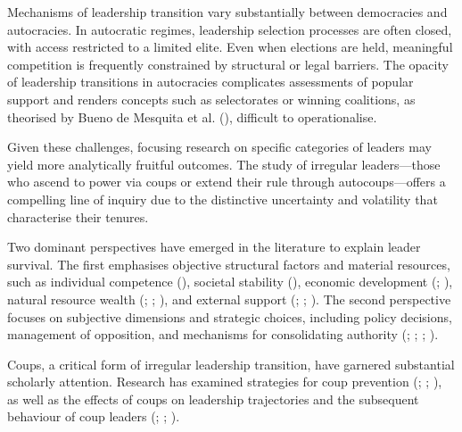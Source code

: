 \documentclass[
  12pt,
]{report}
\begin{document}
Mechanisms of leadership transition vary substantially between
democracies and autocracies. In autocratic regimes, leadership selection
processes are often closed, with access restricted to a limited elite.
Even when elections are held, meaningful competition is frequently
constrained by structural or legal barriers. The opacity of leadership
transitions in autocracies complicates assessments of popular support
and renders concepts such as selectorates or winning coalitions, as
theorised by Bueno de Mesquita et al.
(), difficult to operationalise.

Given these challenges, focusing research on specific categories of
leaders may yield more analytically fruitful outcomes. The study of
irregular leaders---those who ascend to power via coups or extend their
rule through autocoups---offers a compelling line of inquiry due to the
distinctive uncertainty and volatility that characterise their tenures.

Two dominant perspectives have emerged in the literature to explain
leader survival. The first emphasises objective structural factors and
material resources, such as individual competence
(), societal stability
(), economic development
(;
), natural resource wealth
(;
;
), and
external support (;
; ). The second perspective focuses on subjective
dimensions and strategic choices, including policy decisions, management
of opposition, and mechanisms for consolidating authority
(;
;
;
).

Coups, a critical form of irregular leadership transition, have garnered
substantial scholarly attention. Research has examined strategies for
coup prevention (;
; ), as well as the effects of coups on leadership trajectories
and the subsequent behaviour of coup leaders
(;
;
).
\end{document}
